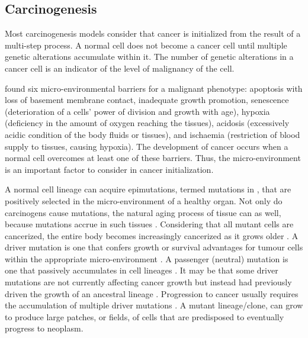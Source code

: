 \documentclass[\main/thesis.tex]{subfiles}
\begin{document}
\subsection{Carcinogenesis}

Most carcinogenesis models consider that cancer is initialized from the result of a multi-step process. A normal cell does not become a cancer cell until multiple genetic alterations accumulate within it. The number of genetic alterations in a cancer cell is an indicator of the level of malignancy of the cell. 

\textcite{Gatenby} found six micro-environmental barriers for a malignant phenotype: apoptosis with loss of basement membrane contact, inadequate growth promotion, senescence (deterioration of a cells' power of division and growth with age), hypoxia (deficiency in the amount of oxygen reaching the tissues), acidosis (excessively acidic condition of the body fluids or tissues), and ischaemia (restriction of blood supply to tissues, causing hypoxia). The development of cancer occurs when a normal cell overcomes at least one of these barriers. Thus, the micro-environment is an important factor to consider in cancer initialization. 

A normal cell lineage can acquire epimutations, termed mutations in \textcite{Curtius}, that are positively selected in the micro-environment of a healthy organ. Not only do carcinogens cause mutations, the natural aging process of tissue can as well, because mutations accrue in such tissues \parencite{Blokzijl}. Considering that all mutant cells are cancerized, the entire body becomes increasingly cancerized as it grows older \parencite{Curtius}. A driver mutation is one that confers growth or survival advantages for tumour cells within the appropriate micro-environment \parencite{Calabrese,MGreaves,Stratton}. A passenger (neutral) mutation is one that passively accumulates in cell lineages  \parencite{Calabrese,MGreaves,Stratton}. It may be that some driver mutations are not currently affecting cancer growth but instead had previously driven the growth of an ancestral lineage \parencite{Curtius}. Progression to cancer usually requires the accumulation of multiple driver mutations \parencite{Weaver}. A mutant lineage/clone, can grow to produce large patches, or fields, of cells that are predisposed to eventually progress to neoplasm. 
\end{document}
